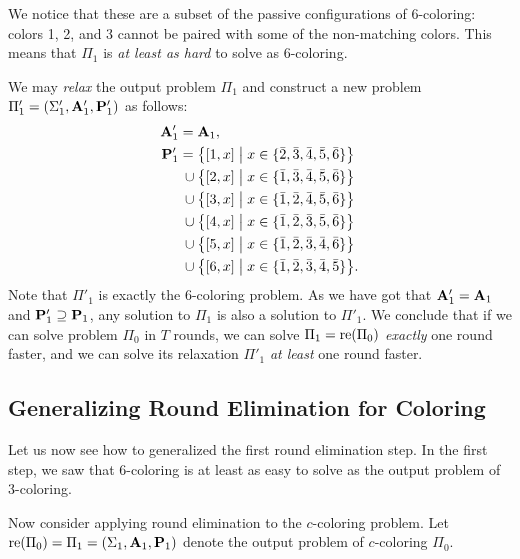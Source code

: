 We notice that these are a subset of the passive configurations of 6-coloring: colors 1, 2, and 3 cannot be paired with some of the non-matching colors. This means that $\Pi_1$ is \emph{at least as hard} to solve as 6-coloring.

We may \emph{relax} the output problem $\Pi_1$ and construct a new problem $\Pi'_1 = (\Sigma'_1, \mathbf{A}'_1, \mathbf{P}'_1)$ as follows:
\begingroup
\allowdisplaybreaks
\begin{align*}
 \mathbf{A}'_1 = {}&\mathbf{A}_1,\\
 \mathbf{P}'_1
       = {}&\bigl\{ [1, x] \bigm| x \in \{ \bar{2}, \bar{3}, \bar{4}, \bar{5}, \bar{6} \} \bigr\} \\
 {} \cup {}&\bigl\{ [2, x] \bigm| x \in \{ \bar{1}, \bar{3}, \bar{4}, \bar{5}, \bar{6} \} \bigr\} \\
 {} \cup {}&\bigl\{ [3, x] \bigm| x \in \{ \bar{1}, \bar{2}, \bar{4}, \bar{5}, \bar{6} \} \bigr\} \\
 {} \cup {}&\bigl\{ [4, x] \bigm| x \in \{ \bar{1}, \bar{2}, \bar{3}, \bar{5}, \bar{6} \} \bigr\} \\
 {} \cup {}&\bigl\{ [5, x] \bigm| x \in \{ \bar{1}, \bar{2}, \bar{3}, \bar{4}, \bar{6} \} \bigr\} \\
 {} \cup {}&\bigl\{ [6, x] \bigm| x \in \{ \bar{1}, \bar{2}, \bar{3}, \bar{4}, \bar{5} \} \bigr\}.
\end{align*}
\endgroup
Note that $\Pi'_1$ is exactly the $6$-coloring problem. As we have got that $\mathbf{A}'_1 = \mathbf{A}_1$ and $\mathbf{P}'_1 \supseteq \mathbf{P}_1$, any solution to $\Pi_1$ is also a solution to $\Pi'_1$. We conclude that if we can solve problem $\Pi_0$ in $T$ rounds, we can solve $\Pi_1 = \operatorname{re}(\Pi_0)$ \emph{exactly} one round faster, and we can solve its relaxation $\Pi'_1$ \emph{at least} one round faster.

\subsection{Generalizing Round Elimination for Coloring}

Let us now see how to generalized the first round elimination step. In the first step, we saw that 6-coloring is at least as easy to solve as the output problem of 3-coloring.

Now consider applying round elimination to the $c$-coloring problem. Let $\operatorname{re}(\Pi_0) = \Pi_1 = (\Sigma_1,\mathbf{A}_1, \mathbf{P}_1)$ denote the output problem of $c$-coloring $\Pi_0$.

